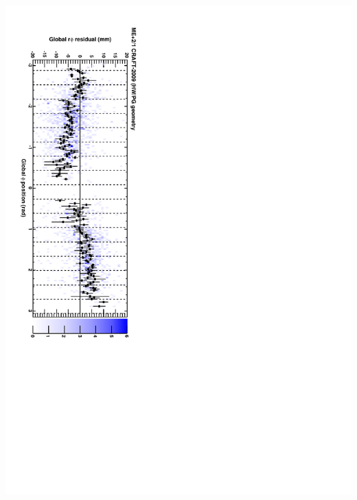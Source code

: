 \documentclass[compress]{beamer}
\begin{document}
\begin{frame}
\includegraphics[height=\linewidth, angle=90]{series11.pdf}
\end{frame}
\end{document}
